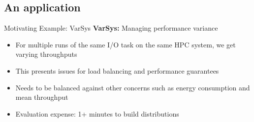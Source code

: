 \documentclass[xcolor=dvipsnames]{beamer}
\begin{document}
\subsection{An application}
\begin{frame}{Motivating Example: VarSys}
\textbf{VarSys:} Managing performance variance
\begin{itemize}
\item For multiple runs of the same I/O task on the same HPC system,
we get varying throughputs
\item This presents issues for load balancing and performance guarantees
\item Needs to be balanced against other concerns such as energy consumption
and mean throughput
\item Evaluation expense: 1+ minutes to build distributions
\end{itemize}
\end{frame}
\end{document}
